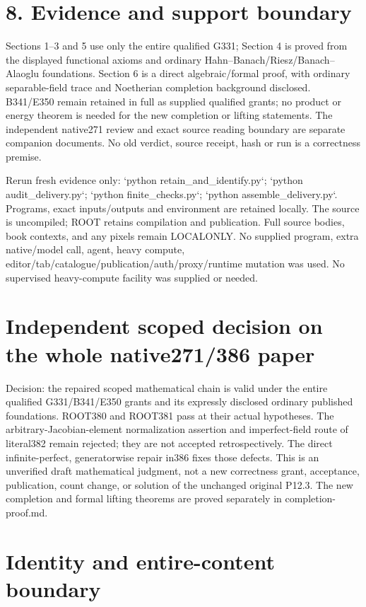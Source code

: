 \documentclass[11pt]{article}
\begin{document}
\section{8. Evidence and support boundary}

Sections 1--3 and 5 use only the entire qualified G331; Section 4 is proved from the displayed functional axioms and ordinary Hahn--Banach/Riesz/Banach--Alaoglu foundations. Section 6 is a direct algebraic/formal proof, with ordinary separable-field trace and Noetherian completion background disclosed. B341/E350 remain retained in full as supplied qualified grants; no product or energy theorem is needed for the new completion or lifting statements. The independent native271 review and exact source reading boundary are separate companion documents. No old verdict, source receipt, hash or run is a correctness premise.

Rerun fresh evidence only: `python retain\_and\_identify.py`; `python audit\_delivery.py`; `python finite\_checks.py`; `python assemble\_delivery.py`. Programs, exact inputs/outputs and environment are retained locally. The source is uncompiled; ROOT retains compilation and publication. Full source bodies, book contexts, and any pixels remain LOCALONLY. No supplied program, extra native/model call, agent, heavy compute, editor/tab/catalogue/publication/auth/proxy/runtime mutation was used. No supervised heavy-compute facility was supplied or needed.

\section{Independent scoped decision on the whole native271/386 paper}

Decision: the repaired scoped mathematical chain is valid under the entire qualified G331/B341/E350 grants and its expressly disclosed ordinary published foundations. ROOT380 and ROOT381 pass at their actual hypotheses. The arbitrary-Jacobian-element normalization assertion and imperfect-field route of literal382 remain rejected; they are not accepted retrospectively. The direct infinite-perfect, generatorwise repair in386 fixes those defects. This is an unverified draft mathematical judgment, not a new correctness grant, acceptance, publication, count change, or solution of the unchanged original P12.3. The new completion and formal lifting theorems are proved separately in completion-proof.md.

\section{Identity and entire-content boundary}
\end{document}
